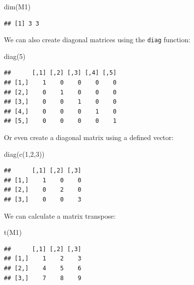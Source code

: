 \documentclass[
]{book}
\newenvironment{Shaded}{\begin{snugshade}}{\end{snugshade}}
\newcommand{\DecValTok}[1]{\textcolor[rgb]{0.00,0.00,0.81}{#1}}
\newcommand{\FunctionTok}[1]{\textcolor[rgb]{0.00,0.00,0.00}{#1}}
\newcommand{\NormalTok}[1]{#1}
\begin{document}
\begin{Shaded}
\begin{Highlighting}[]
\FunctionTok{dim}\NormalTok{(M1)}
\end{Highlighting}
\end{Shaded}

\begin{verbatim}
## [1] 3 3
\end{verbatim}

We can also create diagonal matrices using the \texttt{diag} function:

\begin{Shaded}
\begin{Highlighting}[]
\FunctionTok{diag}\NormalTok{(}\DecValTok{5}\NormalTok{)}
\end{Highlighting}
\end{Shaded}

\begin{verbatim}
##      [,1] [,2] [,3] [,4] [,5]
## [1,]    1    0    0    0    0
## [2,]    0    1    0    0    0
## [3,]    0    0    1    0    0
## [4,]    0    0    0    1    0
## [5,]    0    0    0    0    1
\end{verbatim}

Or even create a diagonal matrix using a defined vector:

\begin{Shaded}
\begin{Highlighting}[]
\FunctionTok{diag}\NormalTok{(}\FunctionTok{c}\NormalTok{(}\DecValTok{1}\NormalTok{,}\DecValTok{2}\NormalTok{,}\DecValTok{3}\NormalTok{))}
\end{Highlighting}
\end{Shaded}

\begin{verbatim}
##      [,1] [,2] [,3]
## [1,]    1    0    0
## [2,]    0    2    0
## [3,]    0    0    3
\end{verbatim}

We can calculate a matrix transpose:

\begin{Shaded}
\begin{Highlighting}[]
\FunctionTok{t}\NormalTok{(M1)}
\end{Highlighting}
\end{Shaded}

\begin{verbatim}
##      [,1] [,2] [,3]
## [1,]    1    2    3
## [2,]    4    5    6
## [3,]    7    8    9
\end{verbatim}
\end{document}
